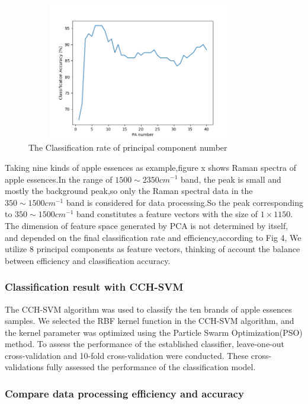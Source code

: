 \documentclass[a4paper]{article}
\begin{document}
    \begin{figure}[h]
  \centering
  \includegraphics[width=10cm,height=6cm]{Figure_3}
  \caption{ The Classification rate of principal component number }
\end{figure}
Taking nine kinds of apple essences as example,figure x shows Raman spectra of apple essences.In the range of $1500 \sim  2350 cm^{-1}$ band, the peak is small and mostly the background peak,so only the Raman spectral data in the $350 \sim 1500 cm^{-1}$ band is considered for data processing.So the peak corresponding to $ 350 \sim 1500 cm^{-1}$ band constitutes a feature vectors with the size of $ 1\times 1150 $.
The dimension of feature space generated by PCA is not determined by itself, and depended on the final classification rate and efficiency,according to Fig 4, We utilize 8 principal components as feature vectors, thinking of account the balance between efficiency and classification accuracy.

    \subsubsection{Classification result with CCH-SVM}



The CCH-SVM algorithm was used to classify the ten brands of apple essences samples. We selected the RBF kernel function in the CCH-SVM algorithm, and the kernel parameter was optimized using the Particle Swarm Optimization(PSO) method. To assess the performance of the established classifier, leave-one-out cross-validation and 10-fold cross-validation were conducted. These cross-validations fully assessed the performance of the classification model.




    \subsubsection{Compare data processing efficiency and accuracy}
\end{document}
